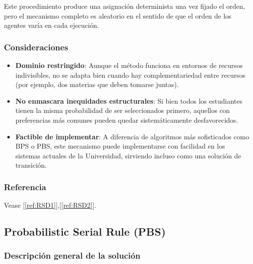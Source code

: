 \documentclass{article}
\begin{document}
Este procedimiento produce una asignación determinista una vez fijado el orden, pero el mecanismo completo es aleatorio en el sentido de que el orden de los agentes varía en cada ejecución.

\subsubsection{Consideraciones}

\begin{itemize}
    \item \textbf{Dominio restringido}: Aunque el método funciona en entornos de recursos indivisibles, no se adapta bien cuando hay complementariedad entre recursos (por ejemplo, dos materias que deben tomarse juntas).
    \item \textbf{No enmascara inequidades estructurales}: Si bien todos los estudiantes tienen la misma probabilidad de ser seleccionados primero, aquellos con preferencias más comunes pueden quedar sistemáticamente desfavorecidos.
    \item \textbf{Factible de implementar}: A diferencia de algoritmos más sofisticados como BPS o PBS, este mecanismo puede implementarse con facilidad en los sistemas actuales de la Universidad, sirviendo incluso como una solución de transición.
\end{itemize}

\subsubsection{Referencia}



Vease [\ref{ref:RSD1}],[\ref{ref:RSD2}].

\subsection{Probabilistic Serial Rule (PBS)}

\subsubsection{Descripción general de la solución}
\end{document}

